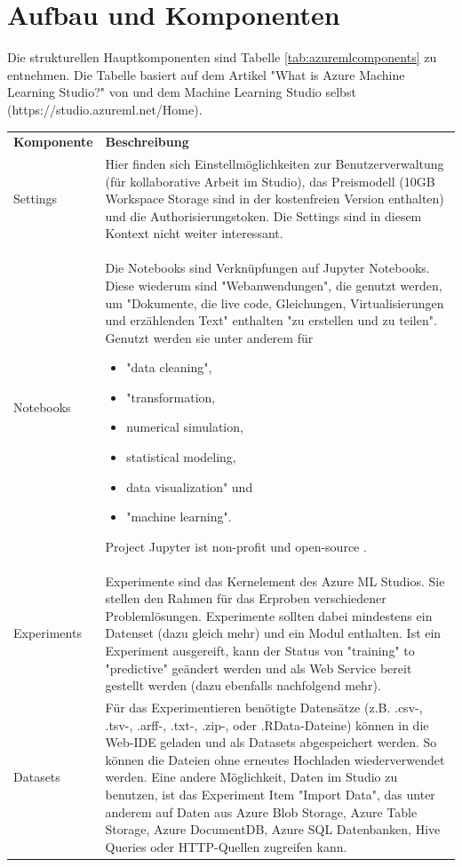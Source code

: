 \section{Aufbau und Komponenten}\label{sec:auK1}
Die strukturellen Hauptkomponenten sind Tabelle \ref{tab:azuremlcomponents} zu entnehmen. Die Tabelle basiert auf dem Artikel "What is Azure Machine Learning Studio?" von \citep{ericson_what_2017} und dem Machine Learning Studio selbst (https://studio.azureml.net/Home).
\begin{longtable}[H]{|p{}|p{14cm}|}
\hline
\textbf{Komponente} & \textbf{Beschreibung}\\ 
\hhline{==}
Settings & Hier finden sich Einstellmöglichkeiten zur Benutzerverwaltung (für kollaborative Arbeit im Studio), das Preismodell (10GB Workspace Storage sind in der kostenfreien Version enthalten) und die Authorisierungstoken. Die Settings sind in diesem Kontext nicht weiter interessant. \\
\hline
Notebooks & Die Notebooks sind Verknüpfungen auf Jupyter Notebooks. Diese wiederum sind "Webanwendungen", die genutzt werden, um "Dokumente, die live code, Gleichungen, Virtualisierungen und erzählenden Text" enthalten "zu erstellen und zu teilen". Genutzt werden sie unter anderem für 
\begin{itemize}
\item "data cleaning",
\item "transformation,
\item numerical simulation,
\item statistical modeling,
\item data visualization" und
\item "machine learning"\citep{projectjupyter_jupyter_2017}.
\end{itemize}
Project Jupyter ist non-profit und open-source \citep{projectjupyter_about_2017}. \\
\hline
Experiments & Experimente sind das Kernelement des Azure ML Studios. Sie stellen den Rahmen für das Erproben verschiedener Problemlösungen. Experimente sollten dabei mindestens ein Datenset (dazu gleich mehr) und ein Modul enthalten. Ist ein Experiment ausgereift, kann der Status von "training" to "predictive" geändert werden und als Web Service bereit gestellt werden (dazu ebenfalls nachfolgend mehr).\\
\hline
Datasets & Für das Experimentieren benötigte Datensätze (z.B. .csv-, .tsv-, .arff-, .txt-, .zip-, oder .RData-Dateine) können in die Web-IDE geladen und als Datasets abgespeichert werden. So können die Dateien ohne erneutes Hochladen wiederverwendet werden. Eine andere Möglichkeit, Daten im Studio zu benutzen, ist das Experiment Item "Import Data", das unter anderem auf Daten aus Azure Blob Storage, Azure Table Storage, Azure DocumentDB, Azure SQL Datenbanken, Hive Queries oder HTTP-Quellen zugreifen kann.\\

\end{longtable}
